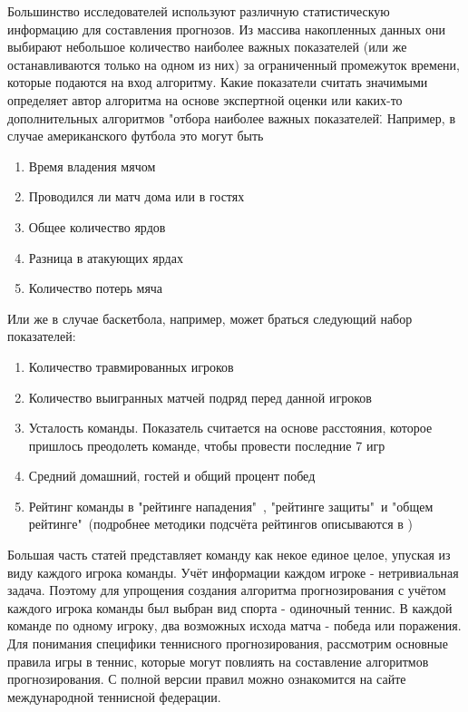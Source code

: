 Большинство исследователей используют различную статистическую информацию для составления прогнозов. Из массива накопленных данных они выбирают небольшое количество наиболее важных показателей (или же останавливаются только на одном из них) за ограниченный промежуток времени, которые подаются на вход алгоритму.
 Какие показатели считать значимыми определяет автор алгоритма на основе экспертной оценки или каких-то дополнительных алгоритмов "отбора наиболее важных показателей\".
 Например, в случае американского футбола\cite{Book02} это могут быть
 \begin{enumerate}
 	\item Время владения мячом
 	\item Проводился ли матч дома или в гостях
 	\item Общее количество ярдов
 	\item Разница в атакующих ярдах
 	\item Количество потерь мяча
 \end{enumerate}
Или же в случае баскетбола, например, может браться следующий набор показателей:
 \begin{enumerate}
	\item  Количество травмированных игроков
	\item Количество выигранных матчей подряд перед данной игроков
	\item Усталость команды. Показатель считается на основе расстояния, которое пришлось преодолеть команде, чтобы провести последние 7 игр
	\item Средний домашний, гостей и общий процент побед
	\item Рейтинг команды в "рейтинге нападения"\ , "рейтинге защиты"\ и "общем рейтинге"\ (подробнее методики подсчёта рейтингов описываются в \cite{Book03})
\end{enumerate}
Большая часть статей представляет команду как некое единое целое, упуская из виду каждого игрока команды. Учёт информации каждом игроке - нетривиальная задача.
Поэтому для упрощения создания алгоритма прогнозирования с учётом каждого игрока команды был выбран вид спорта - одиночный теннис. В каждой команде по одному игроку, два возможных исхода матча - победа или поражения.
Для понимания специфики теннисного прогнозирования, рассмотрим основные правила игры в теннис, которые могут повлиять на составление алгоритмов прогнозирования. С полной версии правил можно ознакомится на сайте международной теннисной федерации\cite{Book04}.
